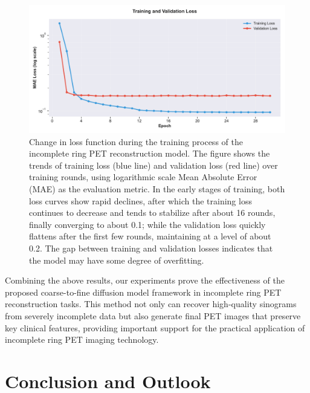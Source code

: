 \documentclass[
reprint,
superscriptaddress,
nofootinbib,
amsmath,amssymb,
aps,
prd,
]{revtex4-2}
\begin{document}
\begin{figure}[ht]
    \centering
    \includegraphics[width=\textwidth]{Images/loss_plot.pdf}
    \caption{Change in loss function during the training process of the incomplete ring PET reconstruction model. The figure shows the trends of training loss (blue line) and validation loss (red line) over training rounds, using logarithmic scale Mean Absolute Error (MAE) as the evaluation metric. In the early stages of training, both loss curves show rapid declines, after which the training loss continues to decrease and tends to stabilize after about 16 rounds, finally converging to about 0.1; while the validation loss quickly flattens after the first few rounds, maintaining at a level of about 0.2. The gap between training and validation losses indicates that the model may have some degree of overfitting.}
    \label{fig:training_validation_loss}
\end{figure}
Combining the above results, our experiments prove the effectiveness of the proposed coarse-to-fine diffusion model framework in incomplete ring PET reconstruction tasks. This method not only can recover high-quality sinograms from severely incomplete data but also generate final PET images that preserve key clinical features, providing important support for the practical application of incomplete ring PET imaging technology.


\section{Conclusion and Outlook}
\label{chap:conclusion}
\end{document}
